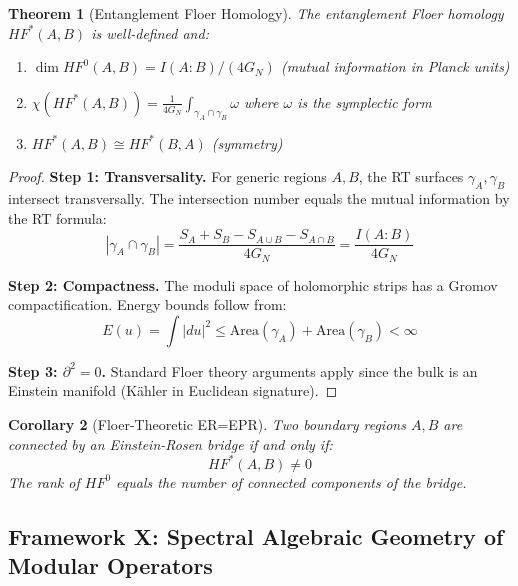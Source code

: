 \documentclass[12pt,a4paper]{article}
\newtheorem{theorem}{Theorem}[section]
\newtheorem{corollary}[theorem]{Corollary}
\begin{document}
\begin{theorem}[Entanglement Floer Homology]\label{thm:ent-floer-homology}
The entanglement Floer homology $HF^*(A, B)$ is well-defined and:
\begin{enumerate}
    \item $\dim HF^0(A, B) = I(A:B) / (4G_N)$ (mutual information in Planck units)
    \item $\chi(HF^*(A,B)) = \frac{1}{4G_N}\int_{\gamma_A \cap \gamma_B} \omega$ where $\omega$ is the symplectic form
    \item $HF^*(A, B) \cong HF^*(B, A)$ (symmetry)
\end{enumerate}
\end{theorem}

\begin{proof}
\textbf{Step 1: Transversality.} For generic regions $A, B$, the RT surfaces $\gamma_A, \gamma_B$ intersect transversally. The intersection number equals the mutual information by the RT formula:
\begin{equation}
|\gamma_A \cap \gamma_B| = \frac{S_A + S_B - S_{A \cup B} - S_{A \cap B}}{4G_N} = \frac{I(A:B)}{4G_N}
\end{equation}

\textbf{Step 2: Compactness.} The moduli space of holomorphic strips has a Gromov compactification. Energy bounds follow from:
\begin{equation}
E(u) = \int |du|^2 \leq \text{Area}(\gamma_A) + \text{Area}(\gamma_B) < \infty
\end{equation}

\textbf{Step 3: $\partial^2 = 0$.} Standard Floer theory arguments apply since the bulk is an Einstein manifold (K\"ahler in Euclidean signature).
\end{proof}

\begin{corollary}[Floer-Theoretic ER=EPR]\label{cor:floer-erepr}
Two boundary regions $A, B$ are connected by an Einstein-Rosen bridge if and only if:
\begin{equation}
HF^*(A, B) \neq 0
\end{equation}
The rank of $HF^0$ equals the number of connected components of the bridge.
\end{corollary}

\subsection{Framework X: Spectral Algebraic Geometry of Modular Operators}
\end{document}
